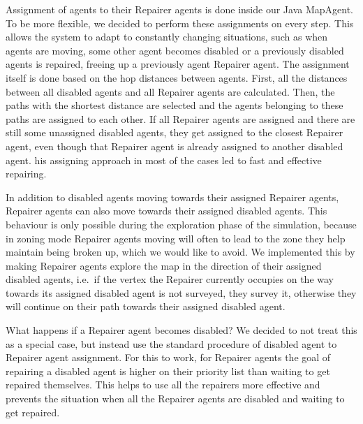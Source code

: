 Assignment of agents to their Repairer agents is done inside our Java MapAgent.
To be more flexible, we decided to perform these assignments on every step.
This allows the system to adapt to constantly changing situations, such as when agents are moving, some other agent becomes disabled or a previously disabled agents is repaired, freeing up a previously agent Repairer agent.
The assignment itself is done based on the hop distances between agents.
First, all the distances between all disabled agents and all Repairer agents are calculated.
Then, the paths with the shortest distance are selected and the agents belonging to these paths are assigned to each other.
If all Repairer agents are assigned and there are still some unassigned disabled agents, they get assigned to the closest Repairer agent, even though that Repairer agent is already assigned to another disabled agent.
his assigning approach in most of the cases led to fast and effective repairing.

In addition to disabled agents moving towards their assigned Repairer agents, Repairer agents can also move towards their assigned disabled agents.
This behaviour is only possible during the exploration phase of the simulation, because in zoning mode Repairer agents moving will often to lead to the zone they help maintain being broken up, which we would like to avoid.
We implemented this by making Repairer agents explore the map in the direction of their assigned disabled agents, i.e.\ if the vertex the Repairer currently occupies on the way towards its assigned disabled agent is not surveyed, they survey it, otherwise they will continue on their path towards their assigned disabled agent.

What happens if a Repairer agent becomes disabled?
We decided to not treat this as a special case, but instead use the standard procedure of disabled agent to Repairer agent assignment.
For this to work, for Repairer agents the goal of repairing a disabled agent is higher on their priority list than waiting to get repaired themselves.
This helps to use all the repairers more effective and prevents the situation when all the Repairer agents are disabled and waiting to get repaired.

